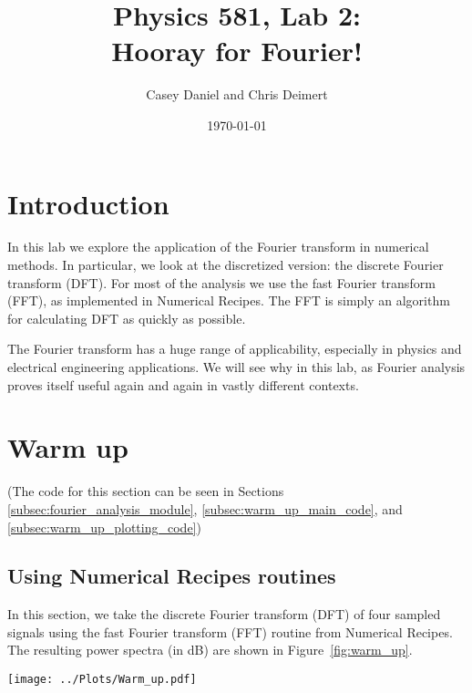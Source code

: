 \documentclass[twocolumn]{myarticle}
\begin{document}
\title{Physics 581, Lab 2:\\Hooray for Fourier!}
\author{Casey Daniel and Chris Deimert}
\date{\today}

\maketitle

\section{Introduction}
\label{sec:introduction}

In this lab we explore the application of the Fourier transform in numerical methods.
In particular, we look at the discretized version: the discrete Fourier transform (DFT).
For most of the analysis we use the fast Fourier transform (FFT), as implemented in Numerical Recipes.
The FFT is simply an algorithm for calculating DFT as quickly as possible.

The Fourier transform has a huge range of applicability, especially in physics and electrical engineering applications.
We will see why in this lab, as Fourier analysis proves itself useful again and again in vastly different contexts.

\section{Warm up}
\label{sec:warm_up}

(The code for this section can be seen in Sections \ref{subsec:fourier_analysis_module}, \ref{subsec:warm_up_main_code}, and \ref{subsec:warm_up_plotting_code})

\subsection{Using Numerical Recipes routines}
\label{subsec:using_numerical_recipes_routines}

In this section, we take the discrete Fourier transform (DFT) of four sampled signals using the fast Fourier transform (FFT) routine from Numerical Recipes.
The resulting power spectra (in dB) are shown in Figure~\ref{fig:warm_up}.

\begin{figure*}[htb]
    \centering
    \texttt{[image: ../Plots/Warm\_up.pdf]}
    \caption{%
        The power spectra of the DFT's of four signals.
        Each signal was sampled at $ t = i/1024 $ for $ i = 1, 2, \ldots, 1024 $.
        The frequencies resulting from the discrete Fourier transform are then $ f = -511, -510, \ldots, 512 $.
    }
    \label{fig:warm_up}
\end{figure*}
\end{document}
